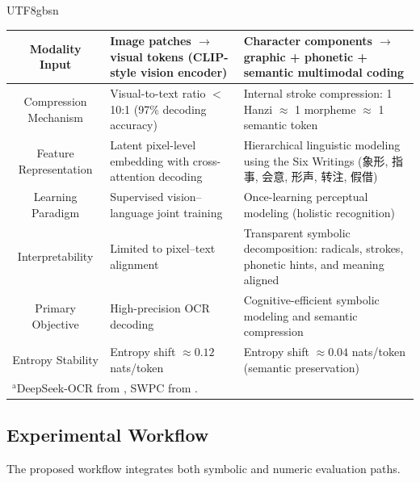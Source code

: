 \documentclass[conference]{IEEEtran}
\begin{document}
\begin{CJK*}{UTF8}{gbsn}
\begin{table}[htbp]
\begin{center}
\begin{tabular}{|c|p{4.2cm}|p{6.5cm}|}
Modality Input &
Image patches $\rightarrow$ visual tokens (CLIP-style vision encoder) &
Character components $\rightarrow$ graphic + phonetic + semantic multimodal coding \\ 
\hline

Compression Mechanism &
Visual-to-text ratio $<$ 10:1 (97\% decoding accuracy) &
Internal stroke compression:
1 Hanzi $\approx$ 1 morpheme $\approx$ 1 semantic token \\
\hline

Feature Representation &
Latent pixel-level embedding with cross-attention decoding &
Hierarchical linguistic modeling using the Six Writings 
(象形, 指事, 会意, 形声, 转注, 假借) \\
\hline

Learning Paradigm &
Supervised vision--language joint training &
Once-learning perceptual modeling (holistic recognition) \\ 
\hline

Interpretability &
Limited to pixel–text alignment &
Transparent symbolic decomposition: radicals, strokes, phonetic hints, and meaning aligned \\
\hline

Primary Objective &
High-precision OCR decoding &
Cognitive-efficient symbolic modeling and semantic compression \\
\hline

Entropy Stability &
Entropy shift $\approx 0.12$ nats/token &
Entropy shift $\approx 0.04$ nats/token (semantic preservation) \\
\hline

\multicolumn{3}{l}{$^{\mathrm{a}}$DeepSeek-OCR from \cite{wei2025deepseek}, SWPC from \cite{weigang2024six}.}
\end{tabular}
\label{tab:ocr_swpc_comparison}
\end{center}
\end{table}


\subsection{Experimental Workflow}

The proposed workflow integrates both symbolic and numeric evaluation paths. %



\end{CJK*}
\end{document}
